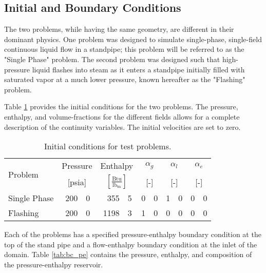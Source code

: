 \subsection{Initial and Boundary Conditions}
\label{subsect:ic_bc}

The two problems, while having the same geometry, are different in their dominant physics.
One problem was designed to simulate single-phase, single-field continuous liquid flow in a standpipe; this problem will be referred to as the "Single Phase" problem.
The second problem was designed such that high-pressure liquid flashes into steam as it enters a standpipe initially filled with saturated vapor at a much lower pressure, known hereafter as the "Flashing" problem.

Table \ref{tab:ic} provides the initial conditions for the two problems.
The pressure, enthalpy, and volume-fractions for the different fields allows for a complete description of the continuity variables.
The initial velocities are set to zero.

\begin{table}[ht]
\centering
\begin{tabular}{@{}lr@{.}lr@{.}lr@{.}lr@{.}lr@{.}l@{}} \toprule
\multirow{2}{*}{Problem} & \multicolumn{2}{c}{Pressure} & \multicolumn{2}{c}{Enthalpy}             & \multicolumn{2}{c}{$\alpha_g$} & \multicolumn{2}{c}{$\alpha_l$} & \multicolumn{2}{c}{$\alpha_e$} \\ 
                         & \multicolumn{2}{c}{[psia]} & \multicolumn{2}{c}{$[\frac{\text{Btu}}{\text{lb}_{\text{m}}}]$} & \multicolumn{2}{c}{[-]}      & \multicolumn{2}{c}{[-]}      & \multicolumn{2}{c}{[-]}      \\ \midrule
Single Phase             &  200&0                       &  355&5                                   & 0&0                            & 1&0                            & 0&0 \\
Flashing                 &  200&0                       & 1198&3                                   & 1&0                            & 0&0                            & 0&0 \\ \bottomrule  
\end{tabular}
\caption{Initial conditions for test problems.}
\label{tab:ic}
\end{table}

Each of the problems has a specified pressure-enthalpy boundary condition at the top of the stand pipe and a flow-enthalpy boundary condition at the inlet of the domain.
Table \ref{tab:bc_pe} contains the pressure, enthalpy, and composition of the pressure-enthalpy reservoir. 

